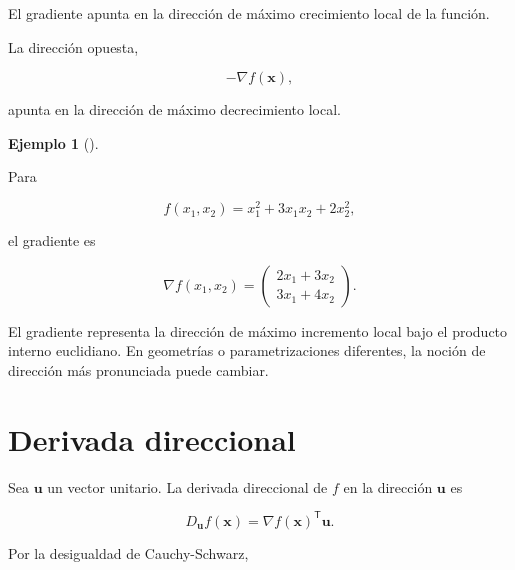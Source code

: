 \documentclass[
  spanish,
  10.5pt,
  letterpaper,
  DIV=11,
  numbers=noendperiod,
  oneside,
  open=any]{scrreprt}
\theoremstyle{definition}
\theoremstyle{definition}
\newtheorem{example}{Ejemplo}[chapter]
\theoremstyle{plain}
\theoremstyle{remark}
\begin{document}
El gradiente apunta en la dirección de máximo crecimiento local de la
función.

La dirección opuesta,

\[
-\nabla f(\mathbf{x}),
\]

apunta en la dirección de máximo decrecimiento local.

\begin{example}[]\protect\hypertarget{exm-gradiente}{}\label{exm-gradiente}

Para

\[
f(x_1,x_2)
=
x_1^2+3x_1x_2+2x_2^2,
\]

el gradiente es

\[
\nabla f(x_1,x_2)
=
\begin{pmatrix}
2x_1+3x_2\\
3x_1+4x_2
\end{pmatrix}.
\]

\end{example}

\begin{tcolorbox}[enhanced jigsaw, arc=.35mm, bottomrule=.15mm, bottomtitle=1mm, breakable, colback=white, colbacktitle=quarto-callout-note-color!10!white, colframe=quarto-callout-note-color-frame, coltitle=black, left=2mm, leftrule=.75mm, opacityback=0, opacitybacktitle=0.6, rightrule=.15mm, title=\textcolor{quarto-callout-note-color}{\faInfo}\hspace{0.5em}{Gradiente y sistema de coordenadas}, titlerule=0mm, toprule=.15mm, toptitle=1mm]

El gradiente representa la dirección de máximo incremento local bajo el
producto interno euclidiano. En geometrías o parametrizaciones
diferentes, la noción de dirección más pronunciada puede cambiar.

\end{tcolorbox}

\section*{Derivada direccional}\label{derivada-direccional}


Sea \(\mathbf{u}\) un vector unitario. La derivada direccional de \(f\)
en la dirección \(\mathbf{u}\) es

\[
D_{\mathbf{u}}f(\mathbf{x})
=
\nabla f(\mathbf{x})^{\mathsf T}\mathbf{u}.
\]

Por la desigualdad de Cauchy-Schwarz,
\end{document}
